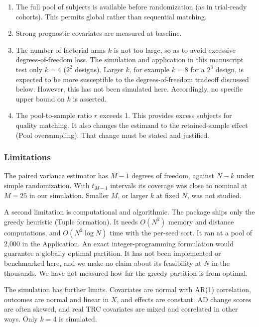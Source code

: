 \documentclass[
  11pt,
]{article}
\providecommand{\tightlist}{%
  \setlength{\itemsep}{0pt}\setlength{\parskip}{0pt}}
\begin{document}
\begin{enumerate}
\def\labelenumi{\arabic{enumi}.}
\tightlist
\item
  The full pool of subjects is available before randomization
  (as in trial-ready cohorts). This permits global rather
  than sequential matching.
\item
  Strong prognostic covariates are measured at baseline.
\item
  The number of factorial arms \(k\) is not too large, so as
  to avoid excessive degrees-of-freedom loss. The simulation
  and application in this manuscript test only \(k = 4\)
  (\(2^2\) designs). Larger \(k\), for example \(k = 8\) for a
  \(2^3\) design, is expected to be more susceptible to the
  degrees-of-freedom tradeoff discussed below. However, this
  has not been simulated here. Accordingly, no specific
  upper bound on \(k\) is asserted.
\item
  The pool-to-sample ratio \(r\) exceeds 1. This provides
  excess subjects for quality matching. It also changes
  the estimand to the retained-sample effect (Pool
  oversampling). That change must be stated and justified.
\end{enumerate}

\subsubsection{Limitations}\label{limitations}

The paired variance estimator has \(M - 1\) degrees of
freedom, against \(N - k\) under simple randomization. With
\(t_{M-1}\) intervals its coverage was close to nominal at
\(M = 25\) in our simulation. Smaller \(M\), or larger \(k\) at
fixed \(N\), was not studied.

A second limitation is computational and algorithmic. The
package ships only the greedy heuristic (Tuple formation).
It needs \(O(N^2)\) memory and distance computations, and
\(O(N^2 \log N)\) time with the per-seed sort. It ran at a
pool of 2,000 in the Application. An exact
integer-programming formulation would guarantee a globally
optimal partition. It has not been implemented or
benchmarked here, and we make no claim about its
feasibility at \(N\) in the thousands. We have not measured
how far the greedy partition is from optimal.

The simulation has further limits. Covariates are normal
with AR(1) correlation, outcomes are normal and linear in
\(X\), and effects are constant. AD change scores are often
skewed, and real TRC covariates are mixed and correlated in
other ways. Only \(k = 4\) is simulated.
\end{document}
